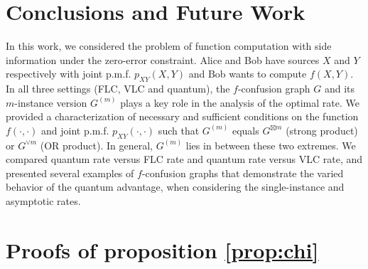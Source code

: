 \documentclass[journal, onecolumn, draftcls]{IEEEtran}
\theoremstyle{definition}
\newcommand{\meng}[1]{\marginpar{+}{\bf Ruoyu's remark}: {\em #1}}
\begin{document}
\section{Conclusions and Future Work}
\label{sec:conclusion}

In this work, we considered the problem of function computation with side information under the zero-error constraint. Alice and Bob have sources $X$ and $Y$ respectively with joint p.m.f. $p_{XY}(X,Y)$ and Bob wants to compute $f(X,Y)$. In all three settings (FLC, VLC and quantum), the $f$-confusion graph $G$ and its $m$-instance version $G^{(m)}$ plays a key role in the analysis of the optimal rate. We provided a characterization of necessary and sufficient conditions on the function $f(\cdot, \cdot)$ and joint p.m.f. $p_{XY}(\cdot,\cdot)$ such that $G^{(m)}$ equals  $G^{\boxtimes m}$ (strong product) or $G^{\lor m}$ (OR product). In general, $G^{(m)}$ lies in between these two extremes. We compared quantum rate versus FLC rate and  quantum rate versus VLC rate, and presented several examples of $f$-confusion graphs that demonstrate the varied behavior of the quantum advantage, when considering the single-instance and asymptotic rates. 

%
 
\newpage


  

 

\newpage
\thispagestyle{empty} %

\mbox{}

\appendices





 \section{Proofs of proposition \ref{prop:chi}} \label{app:appendix_A}
\end{document}
